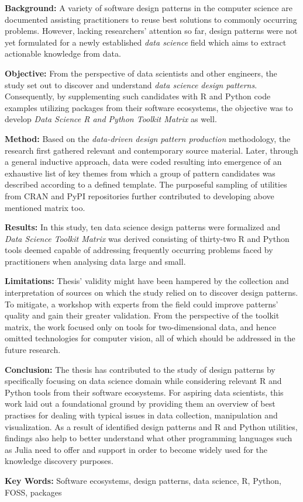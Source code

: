 \begin{singlespace}
\indent \textbf{Background:} A variety of software design patterns in the computer science are documented assisting practitioners to reuse best solutions to commonly occurring problems. 
However, lacking researchers' attention so far, design patterns were not yet formulated for a newly established \emph{data science} field which aims to extract actionable knowledge from data. 

\textbf{Objective:} From the perspective of data scientists and other engineers, the study set out to discover and understand \emph{data science design patterns}.
Consequently, by supplementing such candidates with R and Python code examples utilizing packages from their software ecosystems, the objective was to develop \emph{Data Science R and Python Toolkit Matrix} as well.

\textbf{Method:} Based on the \emph{data-driven design pattern production} methodology, the research first gathered relevant and contemporary source material. 
Later, through a general inductive approach, data were coded resulting into emergence of an exhaustive list of key themes from which a group of pattern candidates was described according to a defined template. 
The purposeful sampling of utilities from \acs{CRAN} and \acs{PyPI} repositories further contributed to developing above mentioned matrix too. 

\textbf{Results:} In this study, ten data science design patterns were formalized and \emph{Data Science Toolkit Matrix} was derived consisting of thirty-two R and Python tools deemed capable of addressing frequently occurring problems faced by practitioners when analysing data large and small. 

\textbf{Limitations:} Thesis' validity might have been hampered by the collection and interpretation of sources on which the study relied on to discover design patterns. 
To mitigate, a workshop with experts from the field could improve patterns' quality and gain their greater validation.
From the perspective of the toolkit matrix, the work focused only on tools for two-dimensional data, and hence omitted technologies for computer vision, all of which should be addressed in the future research.

\textbf{Conclusion:} The thesis has contributed to the study of design patterns by specifically focusing on data science domain while considering relevant R and Python tools from their software ecosystems.
For aspiring data scientists, this work laid out a foundational ground by providing them an overview of best practises for dealing with typical issues in data collection, manipulation and visualization.
As a result of identified design patterns and R and Python utilities, findings also help to better understand what other programming languages such as Julia need to offer and support in order to become widely used for the knowledge discovery purposes.

\bigskip
\noindent \textbf{Key Words:} Software ecosystems, design patterns, data science, R, Python, FOSS, packages

\end{singlespace}